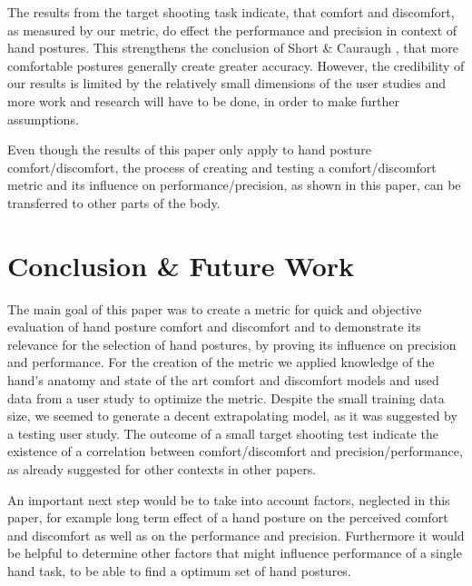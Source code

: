 \documentclass{sig-alternate-05-2015}
\begin{document}
The results from the target shooting task indicate, that comfort and discomfort, as measured by our metric, do effect the performance and precision in context of hand postures. This strengthens the conclusion of Short \& Cauraugh \cite{short1999precision}, that more comfortable postures generally create greater accuracy. However, the credibility of our results is limited by the relatively small dimensions of the user studies and more work and research will have to be done, in order to make further assumptions.

Even though the results of this paper only apply to hand posture comfort/discomfort, the process of creating and testing a comfort/discomfort metric and its influence on performance/precision, as shown in this paper, can be transferred to other parts of the body. 

\section{Conclusion \& Future Work}

The main goal of this paper was to create a metric for quick and objective evaluation of hand posture comfort and discomfort and to demonstrate its relevance for the selection of hand postures, by proving its influence on precision and performance. For the creation of the metric we applied knowledge of the hand's anatomy and state of the art comfort and discomfort models and used data from a user study to optimize the metric. Despite the small training data size, we seemed to generate a decent extrapolating model, as it was suggested by a testing user study. The outcome of a small target shooting test indicate the existence of a correlation between comfort/discomfort and precision/performance, as already suggested for other contexts in other papers.

An important next step would be to take into account factors, neglected in this paper, for example long term effect of a hand posture on the perceived comfort and discomfort as well as on the performance and precision. Furthermore it would be helpful to determine other factors that might influence performance of a single hand task, to be able to find a optimum set of hand postures.

%

%
%

\end{document}
